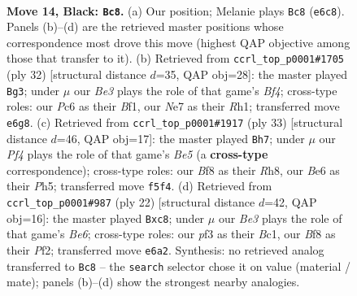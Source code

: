 \documentclass[11pt]{article}
\begin{document}
\clearpage

\begin{figure}[p]\centering
\begin{subfigure}{0.46\textwidth}\centering
\resizebox{\linewidth}{!}{%
\newchessgame
\chessboard[
  setfen={r3kb1r/p3n1pp/2ppb3/5p2/8/N2B1P2/PPP3PP/R1B1R1K1 b kq - 3 14},
  showmover=false,
  pgfstyle=straightmove, color=movearrow, markmove={e6-c8}
]}
\caption{}
\end{subfigure}\hfill
\begin{subfigure}{0.46\textwidth}\centering
\resizebox{\linewidth}{!}{%
\newchessgame
\chessboard[
  setfen={r1bbr1k1/ppp2ppp/6n1/8/3N1BP1/7P/PPP2P2/2KR1B1R w - - 4 17},
  showmover=false,
  pgfstyle=straightmove, color=movearrow, markmove={f4-g3}
]}
\caption{}
\end{subfigure}
\\[4pt]
\begin{subfigure}{0.46\textwidth}\centering
\resizebox{\linewidth}{!}{%
\newchessgame
\chessboard[
  setfen={rn2kb1r/1p3pp1/p1p5/7p/4bPP1/2N1P2P/PP6/R1B1KBR1 b Qkq - 1 17},
  showmover=false,
  pgfstyle=straightmove, color=movearrow, markmove={e4-h7}
]}
\caption{}
\end{subfigure}\hfill
\begin{subfigure}{0.46\textwidth}\centering
\resizebox{\linewidth}{!}{%
\newchessgame
\chessboard[
  setfen={r1b1kb1r/pp2p2p/2p1B1p1/2n5/8/2N5/PPP2PPP/R1B1K2R w KQ - 1 12},
  showmover=false,
  pgfstyle=straightmove, color=movearrow, markmove={e6-c8}
]}
\caption{}
\end{subfigure}
\caption{\textbf{Move 14, Black: \texttt{Bc8}.} (a) Our position; Melanie plays \texttt{Bc8} (\texttt{e6c8}). Panels (b)--(d) are the retrieved master positions whose correspondence most drove this move (highest QAP objective among those that transfer to it). (b) Retrieved from \texttt{ccrl\_top\_p0001\#1705} (ply 32) [structural distance $d$=35, QAP obj=28]: the master played \texttt{Bg3}; under $\mu$ our \emph{Be3} plays the role of that game's \emph{Bf4}; cross-type roles: our \emph{P}c6 as their \emph{B}f1, our \emph{N}e7 as their \emph{R}h1; transferred move \texttt{e6g8}. (c) Retrieved from \texttt{ccrl\_top\_p0001\#1917} (ply 33) [structural distance $d$=46, QAP obj=17]: the master played \texttt{Bh7}; under $\mu$ our \emph{Pf4} plays the role of that game's \emph{Be5} (a \textbf{cross-type} correspondence); cross-type roles: our \emph{B}f8 as their \emph{R}h8, our \emph{B}e6 as their \emph{P}h5; transferred move \texttt{f5f4}. (d) Retrieved from \texttt{ccrl\_top\_p0001\#987} (ply 22) [structural distance $d$=42, QAP obj=16]: the master played \texttt{Bxc8}; under $\mu$ our \emph{Be3} plays the role of that game's \emph{Be6}; cross-type roles: our \emph{p}f3 as their \emph{B}c1, our \emph{B}f8 as their \emph{P}f2; transferred move \texttt{e6a2}. Synthesis: no retrieved analog transferred to \texttt{Bc8} -- the \texttt{search} selector chose it on value (material / mate); panels (b)--(d) show the strongest nearby analogies.}
\label{fig:thought-m27}
\end{figure}
\end{document}
